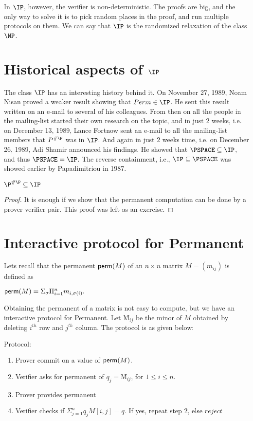 In $\IP$, however, the verifier is non-deterministic. The proofs are big, and the only way to solve
it is to pick random places in the proof, and run multiple protocols on them. We can say that $\IP$
is the randomized relaxation of the class $\NP$.

\section{Historical aspects of $\IP$}
The class $\IP$ has an interesting history behind it. On November 27, 1989, Noam Nisan proved a
weaker result showing that $Perm \in \IP$. He sent this result written on an e-mail to several of
his colleagues. From then on all the people in the mailing-list started their own research on the
topic, and in just 2 weeks, i.e. on December 13, 1989, Lance Fortnow sent an e-mail to all the
mailing-list members that $P^{\#\P}$ was in $\IP$. And again in just 2 weeks time, i.e. on December
26, 1989, Adi Shamir announced his findings. He showed that $\PSPACE \subseteq \IP$, and thus
$\PSPACE = \IP$. The reverse containment, i.e., $\IP \subseteq \PSPACE$ was showed earlier by
Papadimitriou in 1987.

\begin{theorem}
 $\P^{\#\P} \subseteq \IP$
\end{theorem}
\begin{proof}
It is enough if we show that the permanent computation can be done by a prover-verifier pair. This
proof was left as an exercise. 
\end{proof}

\section{Interactive protocol for Permanent}
Lets recall that the permanent ${\sf perm}(M)$ of an $n \times n$ matrix $M = (m_{ij})$ is defined
as 
\begin{center}
 \begin{math}
  {\sf perm}(M) = \Sigma_\sigma \Pi^{n}_{i=1} m_{i, \sigma(i)}.
 \end{math}
\end{center}
Obtaining the permanent of a matrix is not easy to compute, but we have an interactive protocol for
Permanent. Let \~{M}$_{ij}$ be the minor of $M$ obtained by deleting $i^{th}$ row and $j^{th}$
column. The protocol is as given below:

Protocol:
\begin{enumerate}
 \item Prover commit on a value of ${\sf perm}(M)$.
 \item Verifier asks for permanent of $q_j = $\~{M}$_{ij}$, for $1 \leq i \leq n$.
 \item Prover provides permanent
 \item Verifier checks if $\Sigma_{j = 1}^{n} q_j M[i, j] = q$. If yes, repeat step $2$, else
$reject$
\end{enumerate}

